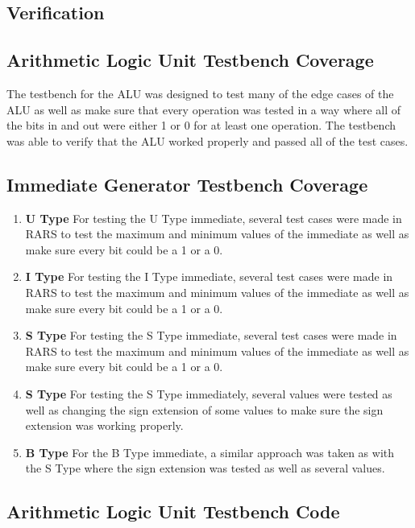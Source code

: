 \documentclass[
    a4paper, %
	12pt, %
    ]{CSSullivanBusinessReport}
\begin{document}
\begin{fullwidth}
\section{Verification} %

\subsection{Arithmetic Logic Unit Testbench Coverage} %

The testbench for the ALU was designed to test many of the edge cases of the ALU as well as make sure that every operation was tested in a way where all of the bits in and out were either 1 or 0 for at least one operation. The testbench was able to verify that the ALU worked properly and passed all of the test cases.

\subsection{Immediate Generator Testbench Coverage} %


\begin{enumerate}
    \item \textbf{U Type} For testing the U Type immediate, several test cases were made in RARS to test the maximum and minimum values of the immediate as well as make sure every bit could be a 1 or a 0.
    \item \textbf{I Type} For testing the I Type immediate, several test cases were made in RARS to test the maximum and minimum values of the immediate as well as make sure every bit could be a 1 or a 0.
    \item \textbf{S Type} For testing the S Type immediate, several test cases were made in RARS to test the maximum and minimum values of the immediate as well as make sure every bit could be a 1 or a 0.
    \item \textbf{S Type} For testing the S Type immediately, several values were tested as well as changing the sign extension of some values to make sure the sign extension was working properly.
    \item \textbf{B Type} For the B Type immediate, a similar approach was taken as with the S Type where the sign extension was tested as well as several values.
\end{enumerate}

\captionsetup{style=widetable}
\subsection{Arithmetic Logic Unit Testbench Code} %


\end{fullwidth}
\end{document}
